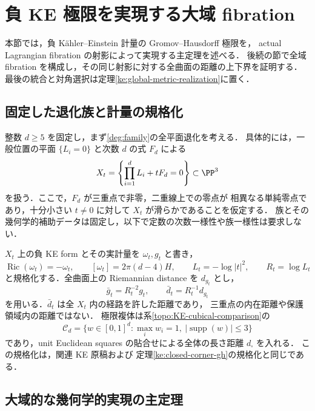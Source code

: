 \section{負 KE 極限を実現する大域 fibration}
\label{ke:global-realization-section}

本節では，負 Kähler--Einstein 計量の Gromov--Hausdorff 極限を，
actual Lagrangian fibration の射影によって実現する主定理を述べる．
後続の節で全域 fibration を構成し，その同じ射影に対する全曲面の距離の上下界を証明する．
最後の統合と対角選択は定理\ref{ke:global-metric-realization}に置く．

\subsection{固定した退化族と計量の規格化}

整数 $d\ge5$ を固定し，まず\eqref{deg:family}の全平面退化を考える．
具体的には，一般位置の平面 $\{L_i=0\}$ と次数 $d$ の式 $F_d$ による
\[
 X_t=\left\{\prod_{i=1}^dL_i+tF_d=0\right\}\subset\PP^3
\]
を扱う．ここで，$F_d$ が三重点で非零，二重線上での零点が
相異なる単純零点であり，十分小さい $t\ne0$ に対して $X_t$ が滑らかであることを仮定する．
族とその幾何学的補助データは固定し，以下で定数の次数一様性や族一様性は要求しない．

$X_t$ 上の負 KE form とその実計量を $\omega_t,g_t$ と書き，
\[
 \operatorname{Ric}(\omega_t)=-\omega_t,\qquad
 [\omega_t]=2\pi(d-4)H,\qquad
 L_t=-\log|t|^2,\qquad R_t=\log L_t
\]
と規格化する．全曲面上の Riemannian distance を $d_{g_t}$ とし，
\[
 \bar g_t=R_t^{-2}g_t,\qquad \bar d_t=R_t^{-1}d_{g_t}
\]
を用いる．$\bar d_t$ は全 $X_t$ 内の経路を許した距離であり，
三重点の内在距離や保護領域内の距離ではない．
極限複体は系\ref{topo:KE-cubical-comparison}の
\[
 \mathcal C_d=
 \{w\in[0,1]^d:\max_i w_i=1,\ |\operatorname{supp}(w)|\le3\}
\]
であり，unit Euclidean squares の貼合せによる全体の長さ距離 $d_\square$ を入れる．
この規格化は，関連 KE 原稿\cite{KELocalCurrent,KECubicalCurrent}および
定理\ref{ke:closed-corner-gh}の規格化と同じである．

\subsection{大域的な幾何学的実現の主定理}

